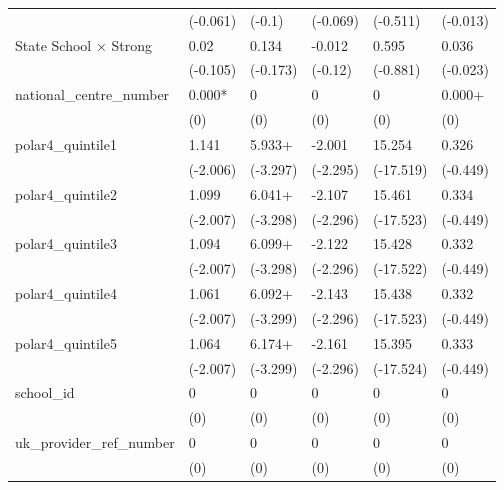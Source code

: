 \begin{longtable}{llllll}
 & (-0.061) & (-0.1) & (-0.069) & (-0.511) & (-0.013) \\
State School × Strong & 0.02 & 0.134 & -0.012 & 0.595 & 0.036 \\
 & (-0.105) & (-0.173) & (-0.12) & (-0.881) & (-0.023) \\
national\_centre\_number & 0.000* & 0 & 0 & 0 & 0.000+ \\
 & (0) & (0) & (0) & (0) & (0) \\
polar4\_quintile1 & 1.141 & 5.933+ & -2.001 & 15.254 & 0.326 \\
 & (-2.006) & (-3.297) & (-2.295) & (-17.519) & (-0.449) \\
polar4\_quintile2 & 1.099 & 6.041+ & -2.107 & 15.461 & 0.334 \\
 & (-2.007) & (-3.298) & (-2.296) & (-17.523) & (-0.449) \\
polar4\_quintile3 & 1.094 & 6.099+ & -2.122 & 15.428 & 0.332 \\
 & (-2.007) & (-3.298) & (-2.296) & (-17.522) & (-0.449) \\
polar4\_quintile4 & 1.061 & 6.092+ & -2.143 & 15.438 & 0.332 \\
 & (-2.007) & (-3.299) & (-2.296) & (-17.523) & (-0.449) \\
polar4\_quintile5 & 1.064 & 6.174+ & -2.161 & 15.395 & 0.333 \\
 & (-2.007) & (-3.299) & (-2.296) & (-17.524) & (-0.449) \\
school\_id & 0 & 0 & 0 & 0 & 0 \\
 & (0) & (0) & (0) & (0) & (0) \\
uk\_provider\_ref\_number & 0 & 0 & 0 & 0 & 0 \\
 & (0) & (0) & (0) & (0) & (0) \\
\end{longtable}